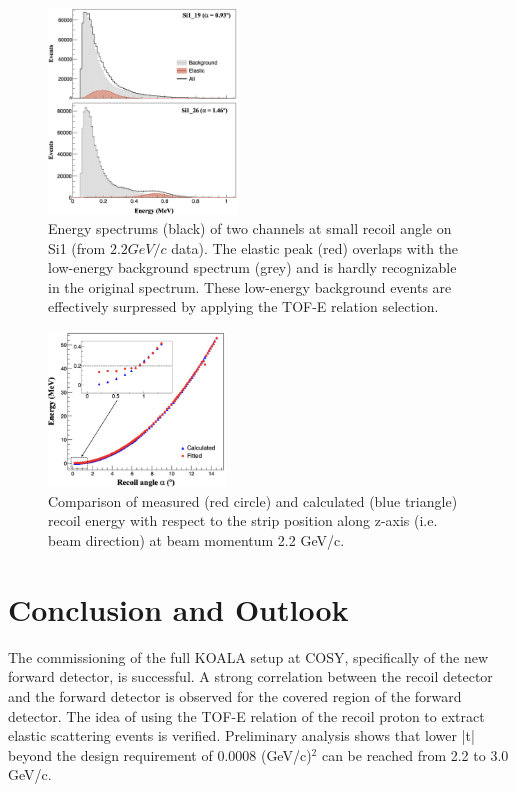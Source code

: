 \documentclass[number,5p]{elsarticle}
\begin{document}
\begin{figure}[h!]
  \centering
  \includegraphics[width=0.45\textwidth]{./comparison_tof_e_cut_2.2_angle.png}
  \caption{Energy spectrums (black) of two channels at small recoil angle on Si1 (from
    $2.2 GeV/c$ data). The elastic peak (red) overlaps with the low-energy background
    spectrum (grey) and is hardly recognizable in the original spectrum. These low-energy background events are effectively surpressed by applying the TOF-E relation selection.}
  \label{fig:cut}
\end{figure}


\begin{figure}[h!]
  \centering
  \includegraphics[width=0.42\textwidth]{./calc_vs_measured_2.2_angle_combined.png}
  \caption{
    Comparison of measured (red circle) and calculated (blue triangle) recoil energy with respect to the strip position along z-axis (i.e. beam direction) at beam momentum 2.2 GeV/c.}
  \label{fig:measured_vs_calculated}
\end{figure}


\section{Conclusion and Outlook}
\label{sec:conclusion}

The commissioning of the full KOALA setup at COSY, specifically of the new forward detector, is successful.
A strong correlation between the recoil detector and the forward detector is
observed for the covered region of the forward detector.
The idea of using the TOF-E relation of the recoil proton to extract elastic
scattering events is verified.
Preliminary analysis shows that lower |t| beyond the design requirement of 0.0008 (GeV/c)$^2$ can be reached from 2.2 to 3.0 GeV/c. 
\end{document}
